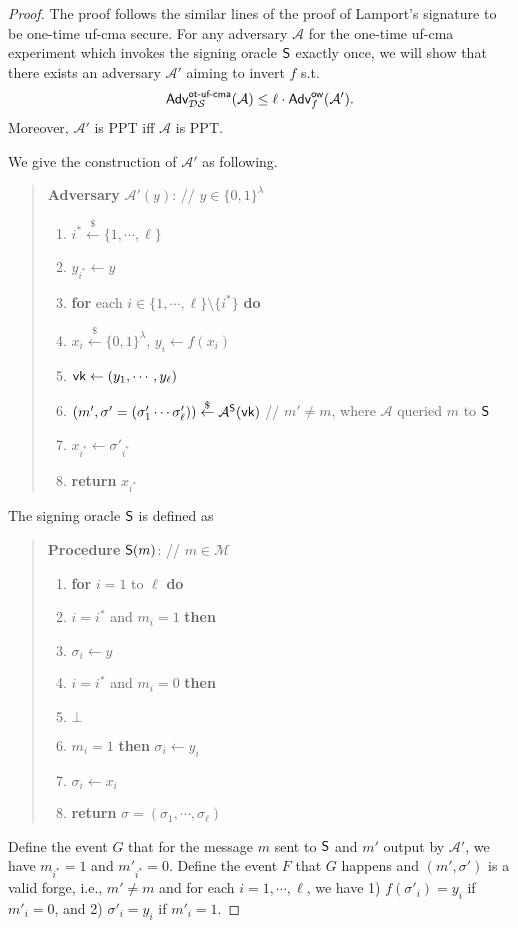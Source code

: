 \documentclass[12pt]{article}
\newcommand{\bits}{\{0,1\}}
\newcommand{\getsr}{\stackrel{\$}{\gets}}
\newcommand{\Adv}{\textsf{Adv}}
\newcommand{\tab}{\hspace{0.3in}}
\newcommand{\M}{\mathcal{M}}
\theoremstyle{definition}
\newcommand{\A}{\mathcal{A}}
\begin{document}
\begin{proof}
The proof follows the similar lines of the proof of Lamport's signature to be one-time uf-cma secure. For any adversary $\A$ for the one-time uf-cma experiment which invokes the signing oracle $\textsf{S}$ exactly once, we will show that there exists an adversary $\A'$ aiming to invert $f$ s.t. 
$$\Adv_{\DS}^{\textsf{ot-uf-cma}}(\A) \leq \ell\cdot\Adv_{f}^{\textsf{ow}}(\A').$$
Moreover, $\A'$ is PPT iff $\A$ is PPT. 

We give the construction of $\A'$ as following.
\begin{quote}
{\bf Adversary} $\A'(y)$: // $y\in\bits^\lambda$
\begin{enumerate}
\item $i^* \getsr \{1,\cdots,\ell\}$
\item $y_{i^*} \gets y$
\item {\bf for} each $i \in \{1,\cdots,\ell\}\setminus\{i^*\}$ {\bf do}
\item \tab $x_i \getsr \bits^\lambda$, $y_i \gets f(x_i)$
\item $\textsf{vk} \gets (y_1, \cdots, y_{\ell})$
\item $(m', \sigma'=(\sigma'_1\cdots\sigma'_{\ell}))\getsr \A^{\SO}(\vk)$ // $m'\not=m$, where $\A$ queried $m$ to $\textsf{S}$
\item $x_{i^*} \gets \sigma'_{i^*}$
\item {\bf return} $x_{i^*}$
\end{enumerate}
\end{quote}
The signing oracle $\textsf{S}$ is defined as
\begin{quote}
{\bf Procedure} $\textsf{S}(m)$: // $m\in\M$
\begin{enumerate}
\item {\bf for} $i=1$ to $\ell$ {\bf do}
\item \tab {\bf if} $i = i^*$ and $m_i=1$ {\bf then}
\item \tab \tab $\sigma_{i} \gets y$
\item \tab {\bf else if} $i=i^*$ and $m_i=0$ {\bf then}
\item \tab \tab {\bf return} $\bot$
\item \tab {\bf else if} $m_i=1$ {\bf then} $\sigma_i \gets y_i$
\item \tab {\bf else} $\sigma_i \gets x_i$
\item {\bf return} $\sigma = (\sigma_1, \cdots, \sigma_{\ell})$
\end{enumerate}
\end{quote}
Define the event $G$ that for the message $m$ sent to $\textsf{S}$ and $m'$ output by $\A'$, we have $m_{i^*} = 1$ and $m'_{i^*} = 0$. Define the event $F$ that $G$ happens and $(m',\sigma')$ is a valid forge, i.e., $m'\not=m$ and for each $i=1,\cdots,\ell$, we have 1) $f(\sigma'_i)=y_i$ if $m'_i=0$, and 2) $\sigma'_i=y_i$ if $m'_i=1$.


\end{proof}
\end{document}
